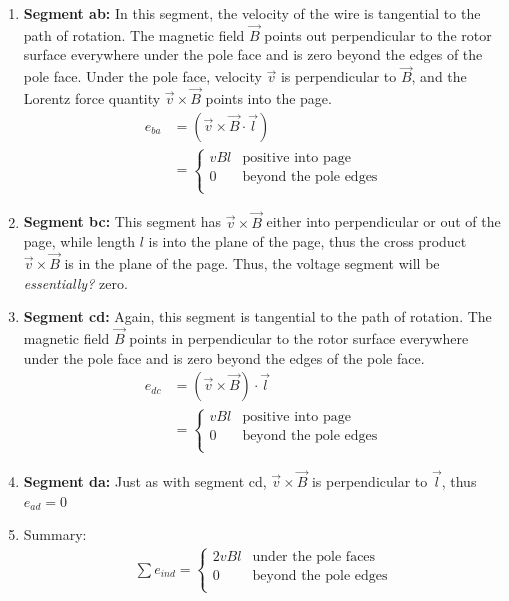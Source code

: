 \documentclass{book}
\begin{document}
\begin{enumerate}
	\item \textbf{Segment ab:} In this segment, the velocity of the wire is tangential to the path of rotation. The magnetic field $\vec{B}$ points out perpendicular to the rotor surface everywhere under the pole face and is zero beyond the edges of the pole face. Under the pole face, velocity $\vec{v}$  is perpendicular to $\vec{B}$, and the Lorentz force quantity $\vec{v} \times \vec{B}$ points into the page. 
	\begin{align*}
		e_{ba} &= (\vec{v} \times \vec{B} \cdot \vec{l}) \\
		&= \begin{cases} v Bl & \text{positive into page} \\
			0	& \text{beyond the pole edges} \\
		\end{cases} 
	\end{align*}
	\item \textbf{Segment bc:} This segment has $\vec{v} \times \vec{B}$ either into perpendicular or out of the page, while length $l$ is into the plane of the page, thus the cross product $\vec{v} \times \vec{B}$ is in the plane of the page. Thus, the voltage segment will be \textit{essentially?} zero.
	
	\item \textbf{Segment cd:} Again, this segment is tangential to the path of rotation. The magnetic field $\vec{B}$ points in perpendicular to the rotor surface everywhere under the pole face and is zero beyond the edges of the pole face. 
	\begin{align*}
		e_{dc} &= (\vec{v}\times \vec{B}) \cdot \vec{l} \\
		&= \begin{cases} v Bl & \text{positive into page} \\
			0	& \text{beyond the pole edges} \\
		\end{cases} 
	\end{align*}
	\item \textbf{Segment da:} Just as with segment cd, $\vec{v} \times \vec{B}$ is perpendicular to $\vec{l}$, thus $e_{ad} = 0$
	\item Summary: 
	\begin{align*}
		\sum e_{ind} = \begin{cases}2 v Bl & \text{under the pole faces} \\
			0	& \text{beyond the pole edges} \\ \end{cases}
	\end{align*}
\end{enumerate}
\end{document}
